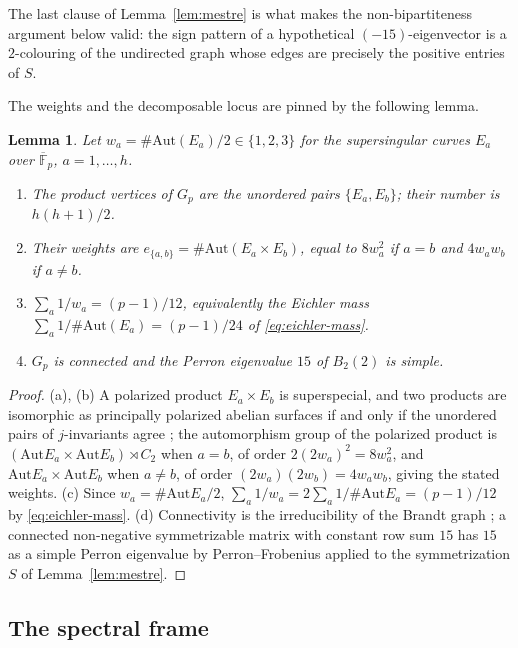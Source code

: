 \documentclass[10pt,a4paper]{amsart}
\newtheorem{lemma}[theorem]{Lemma}
\newcommand{\F}{\mathbb{F}}
\newcommand{\Aut}{\mathrm{Aut}}
\begin{document}
	The last clause of Lemma~\ref{lem:mestre} is what makes the
	non-bipartiteness argument below valid: the sign pattern of a hypothetical
	$(-15)$-eigenvector is a $2$-colouring of the undirected graph whose edges
	are precisely the positive entries of $S$.
	
	The weights and the decomposable locus are pinned by the following lemma.
	
	\begin{lemma}\label{lem:vertices}
		Let $w_a=\#\Aut(E_a)/2\in\{1,2,3\}$ for the supersingular curves $E_a$
		over $\overline{\F}_p$, $a=1,\ldots,h$.
		\begin{enumerate}[label=\textup{(\alph*)},leftmargin=2.2em]
			\item The product vertices of $G_p$ are the unordered pairs
			$\{E_a,E_b\}$; their number is $h(h+1)/2$.
			\item Their weights are $e_{\{a,b\}}=\#\Aut(E_a\times E_b)$, equal to
			$8w_a^2$ if $a=b$ and $4w_aw_b$ if $a\ne b$.
			\item $\sum_a 1/w_a=(p-1)/12$, equivalently the Eichler mass
			$\sum_a 1/\#\Aut(E_a)=(p-1)/24$ of \eqref{eq:eichler-mass}.
			\item $G_p$ is connected and the Perron eigenvalue $15$ of $B_2(2)$ is
			simple.
		\end{enumerate}
	\end{lemma}
	
	\begin{proof}
		(a), (b) A polarized product $E_a\times E_b$ is superspecial, and two
		products are isomorphic as principally polarized abelian surfaces if and
		only if the unordered pairs of $j$-invariants agree \cite[\S3]{IKO1986};
		the automorphism group of the polarized product is
		$(\Aut E_a\times\Aut E_b)\rtimes C_2$ when $a=b$, of order
		$2(2w_a)^2=8w_a^2$, and $\Aut E_a\times\Aut E_b$ when $a\ne b$, of order
		$(2w_a)(2w_b)=4w_aw_b$, giving the stated weights. (c) Since
		$w_a=\#\Aut E_a/2$, $\sum_a 1/w_a=2\sum_a 1/\#\Aut E_a=(p-1)/12$ by
		\eqref{eq:eichler-mass}. (d) Connectivity is the irreducibility of the
		Brandt graph \cite[Thm.~44]{JordanZaytman}; a connected non-negative
		symmetrizable matrix with constant row sum $15$ has $15$ as a simple
		Perron eigenvalue by Perron--Frobenius applied to the symmetrization $S$
		of Lemma~\ref{lem:mestre}.
	\end{proof}
	
	\subsection{The spectral frame}
	\label{ss:spectral-frame}
	
\end{document}
